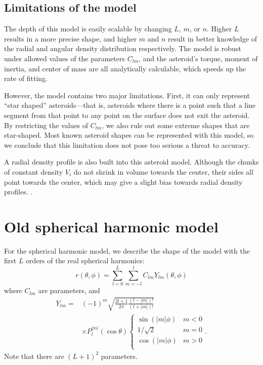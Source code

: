 \documentclass[aps,twocolumn,secnumarabic,balancelastpage,amsmath,amssymb,nofootinbib,floatfix]{revtex4-1}
\begin{document}
\subsection{Limitations of the model}
The depth of this model is easily scalable by changing $L$, $m$, or $n$. Higher $L$ results in a more precise shape, and higher $m$ and $n$ result in better knowledge of the radial and angular density distribution respectively. The model is robust under allowed values of the parameters $C_{lm}$, and the asteroid's torque, moment of inertia, and center of mass are all analytically calculable, which speeds up the rate of fitting.

However, the model contains two major limitations. First, it can only represent ``star shaped'' asteroids---that is, asteroids where there is a point such that a line segment from that point to any point on the surface does not exit the asteroid. By restricting the values of $C_{lm}$, we also rule out some extreme shapes that are star-shaped. Most known asteroid shapes can be represented with this model, so we conclude that this limitation does not pose too serious a threat to accuracy. 

A radial density profile is also built into this asteroid model. Although the chunks of constant density $V_i$ do not shrink in volume towards the center, their sides all point towards the center, which may give a slight bias towards radial density profiles. .


\newpage

\section{Old spherical harmonic model}
For the spherical harmonic model, we describe the shape of the model with the first $L$ orders of the real spherical harmonics:
\begin{equation}
    r(\theta, \phi) = \sum_{l=0}^L\sum_{m=-l}^l C_{lm} Y_{lm}(\theta, \phi)
    \label{eqn:sph-surface}
\end{equation}
where $C_{lm}$ are parameters, and
\begin{equation}
\begin{aligned}
    Y_{lm} = &(-1)^m\sqrt{\frac{2l + 1}{2\pi}\frac{(l-|m|)!}{(l+|m|)!}}\\
    &\times P_l^{|m|}(\cos\theta)\begin{cases}
        \sin(|m|\phi)& m < 0\\
        1/\sqrt{2}& m = 0\\
        \cos(|m|\phi)& m > 0\\
    \end{cases}.
    \label{eqn:spherical-harmonics}
\end{aligned}
\end{equation}
Note that there are $(L+1)^2$ parameters.
\end{document}
